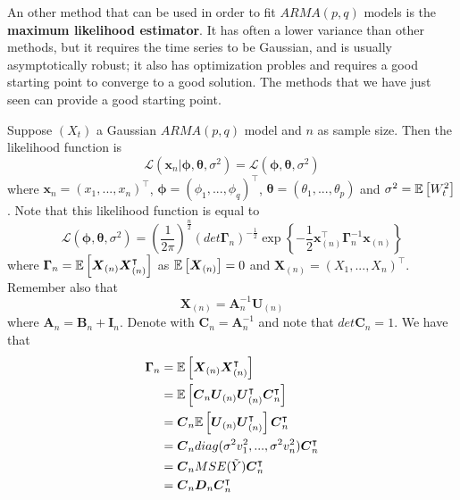 An other method that can be used in order to fit $ARMA(p,q)$ models is the \textbf{maximum likelihood estimator}. It has often a lower variance than other methods, but it requires the time series to be Gaussian, and is usually asymptotically robust; it also has optimization probles and requires a good starting point to converge to a good solution. The methods that we have just seen can provide a good starting point.

Suppose $(X_t)$ a Gaussian $ARMA(p,q)$ model and $n$ as sample size. Then the likelihood function is 
\[
    \mathcal{L}(\boldsymbol{x}_n|\boldsymbol{\phi},\boldsymbol{\theta},\sigma^2)=\mathcal{L}(\boldsymbol{\phi},\boldsymbol{\theta},\sigma^2)  
\]
where $\boldsymbol{x}_n=(x_1,...,x_n)^\intercal$, $\boldsymbol{\phi}=(\phi_1,...,\phi_q)^\intercal$, $\boldsymbol{\theta}=(\theta_1,...,\theta_p)$ and $\sigma^2=\mathbb{E}\left[W_t^2\right]$. Note that this likelihood function is equal to
\[
    \mathcal{L}(\boldsymbol{\phi},\boldsymbol{\theta},\sigma^2)=\left(\frac{1}{2\pi}\right)^{\frac{n}{2}}(det\boldsymbol{\Gamma}_n)^{-\frac{1}{2}}\exp\left\{-\frac{1}{2}\boldsymbol{x}_{(n)}^\intercal\boldsymbol{\Gamma}_n^{-1}\boldsymbol{x}_{(n)}\right\}
\]
where $\boldsymbol{\Gamma}_n=\mathbb{E}\left[\boldsymbol{X}_{(n)}\boldsymbol{X}_{(n)}^\intercal\right]$ as $\mathbb{E}\left[\boldsymbol{X}_{(n)}\right]=0$ and $\boldsymbol{X}_{(n)}=(X_1,...,X_n)^\intercal$. Remember also that
\[
    \boldsymbol{X}_{(n)}=\boldsymbol{A}_n^{-1}\boldsymbol{U}_{(n)}  
\]
where $\boldsymbol{A}_n=\boldsymbol{B}_n+\boldsymbol{I}_n$. Denote with $\boldsymbol{C}_n=\boldsymbol{A}_n^{-1}$ and note that $det\boldsymbol{C}_n=1$. We have that
\begin{equation*}
    \begin{split}
        \boldsymbol{\Gamma}_n&=\mathbb{E}\left[\boldsymbol{X}_{(n)}\boldsymbol{X}_{(n)}^\intercal\right]\\ 
        &=\mathbb{E}\left[\boldsymbol{C}_n\boldsymbol{U}_{(n)}\boldsymbol{U}_{(n)}^\intercal\boldsymbol{C}_n^\intercal\right]\\
        &=\boldsymbol{C}_n\mathbb{E}\left[\boldsymbol{U}_{(n)}\boldsymbol{U}_{(n)}^\intercal\right]\boldsymbol{C}_n^\intercal\\
        &=\boldsymbol{C}_ndiag(\sigma^2v_1^2,...,\sigma^2v_n^2)\boldsymbol{C}_n^\intercal\\
        &=\boldsymbol{C}_nMSE(\tilde{Y})\boldsymbol{C}_n^\intercal\\
        &=\boldsymbol{C}_n\boldsymbol{D}_n\boldsymbol{C}_n^\intercal\\
    \end{split}
\end{equation*}
